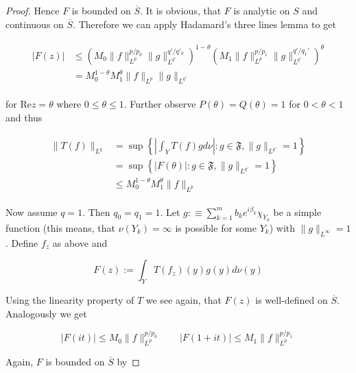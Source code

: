 \begin{proof}
		
		Hence $F$ is bounded on $\overline{S}$. It is obvious, that $F$ is analytic on $S$ and continuous on $\overline{S}$. Therefore we can apply Hadamard's three lines lemma to get

		\begin{gather}
			\begin{aligned}
				\vert F(z) \vert &\leqslant \left( M_0  \|f\|_{L^p}^{p/p_0} \|g\|_{L^{q'}}^{q'/q'_0} \right)^{1 - \theta}\left(  M_1 \|f\|_{L^p}^{p/p_1}\|g\|_{L^{q'}}^{q'/q_1'} \right)^\theta\\
			&= M_0^{1 - \theta}M_1^\theta \|f\|_{L^p}\|g\|_{L^{q'}}
			\label{est:F}
		\end{aligned}
		\end{gather}

		for $\mathrm{Re}z = \theta$ where $0 \leqslant \theta \leqslant 1$. Further observe $P(\theta) = Q(\theta) = 1$ for $0 < \theta < 1$ and thus 
		
		\begin{gather}
			\begin{aligned}
				\|T(f)\|_{L^q} &= \sup\left\{\left\vert \int_Y T(f)gd\nu\right\vert : g \in \mathfrak{F}, \|g\|_{L^{q'}} = 1\right\}\\
				&=  \sup\left\{\left\vert F(\theta)\right\vert : g \in \mathfrak{F}, \|g\|_{L^{q'}} = 1\right\}\\
				&\leqslant M_0^{1 - \theta}M_1^\theta \|f\|_{L^p}
				\label{id:F}
			\end{aligned}
		\end{gather}

		Now assume \underline{$q = 1$}. Then $q_0 = q_1 = 1$. Let $g :\equiv \sum_{k = 1}^m b_k e^{i\beta_k}\chi_{Y_k}$ be a simple function (this means, that $\nu(Y_k) = \infty$ is possible for some $Y_k$) with $\|g\|_{L^{\infty}} = 1$. Define $f_z$ as above and

		\begin{equation}
			F(z) := \int_Y T(f_z)(y)g(y)d\nu(y)	
		\end{equation}

		Using the linearity property of $T$ we see again, that $F(z)$ is well-defined on $\overline{S}$. Analogously we get 

		\begin{equation}
			\vert F(it)\vert \leqslant M_0 \|f\|_{L^p}^{p/p_0} \qquad \vert F(1 + it) \vert \leqslant M_1 \|f\|_{L^p}^{p/p_1}
		\end{equation}

		Again, $F$ is bounded on $\overline{S}$ by 


\end{proof}
